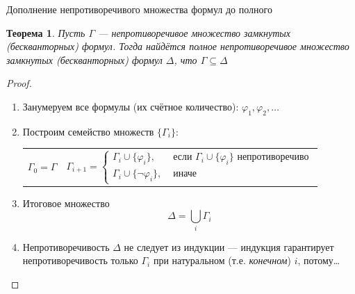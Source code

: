\documentclass[aspectratio=169]{beamer}
\newtheorem{thm}{Теорема}[section]
\begin{document}
\begin{frame}{Дополнение непротиворечивого множества формул до полного}
\begin{thm}Пусть $\Gamma$ --- непротиворечивое множество замкнутых (бескванторных) формул. Тогда
найдётся полное непротиворечивое множество замкнутых (бескванторных) формул $\Delta$, что
$\Gamma \subseteq \Delta$
\end{thm}\pause

\begin{proof}
\begin{enumerate}
\item Занумеруем все формулы (их счётное количество): $\varphi_1, \varphi_2, \dots$\pause
\item Построим семейство множеств $\{\Gamma_i\}$:
\begin{tabular}{cc}
$\Gamma_0 = \Gamma$  &
\begin{minipage}{12cm}
$$\Gamma_{i+1} = \left\{\begin{array}{ll}\Gamma_i \cup \{\varphi_i\},& \mbox{ если } \Gamma_i \cup \{\varphi_i\} \mbox{ непротиворечиво}\\
                                               \Gamma_i \cup \{\neg\varphi_i\},& \mbox{ иначе}\end{array}\right.$$
\end{minipage}\end{tabular}\pause
\item Итоговое множество $$\Delta = \bigcup_i \Gamma_i$$\pause\vspace{-0.2cm}
\item Непротиворечивость $\Delta$ не следует из индукции --- индукция гарантирует непротиворечивость
      только $\Gamma_i$ при натуральном (т.е. \emph{конечном}) $i$, потому\dots
\end{enumerate}
\end{proof}
\end{frame}
\end{document}
